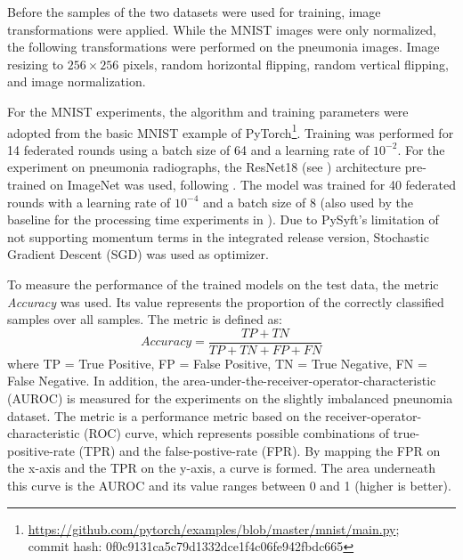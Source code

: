 Before the samples of the two datasets were used for training, image transformations were applied. While the MNIST images were only normalized, the following transformations were performed on the pneumonia images.
Image resizing to $256 \times 256$ pixels,
random horizontal flipping,
random vertical flipping,
and image normalization.

For the MNIST experiments, the algorithm and training parameters were adopted from the basic MNIST example of PyTorch\footnote{\url{https://github.com/pytorch/examples/blob/master/mnist/main.py};\\commit hash: 0f0c9131ca5c79d1332dce1f4c06fe942fbdc665}. Training was performed for 14 federated rounds using a batch size of 64 and a learning rate of $10^{-2}$. For the experiment on pneumonia radiographs, the ResNet18 (see \cite{He2016DeepRecognition}) architecture pre-trained on ImageNet was used, following \cite{Kaissis2021End-to-endImaging}. The model was trained for 40 federated rounds with a learning rate of $10^{-4}$ and a batch size of 8 (also used by the baseline for the processing time experiments in \cite{Kaissis2021End-to-endImaging}). Due to PySyft's limitation of not supporting momentum terms in the integrated release version, Stochastic Gradient Descent (SGD) was used as optimizer.

To measure the performance of the trained models on the test data, the metric \textit{Accuracy} was used. Its value represents the proportion of the correctly classified samples over all samples. The metric is defined as:
\begin{equation}
Accuracy=\frac{TP + TN}{TP + TN + FP + FN} \label{eq:accuracy}
\end{equation}
where TP = True Positive, FP = False Positive, TN = True Negative, FN = False Negative.
In addition, the area-under-the-receiver-operator-characteristic (AUROC) is measured for the experiments on the slightly imbalanced pneunomia dataset.
The metric is a performance metric based on the receiver-operator-characteristic (ROC) curve, which represents possible combinations of true-positive-rate (TPR) and the false-postive-rate (FPR).
By mapping the FPR on the x-axis and the TPR on the y-axis, a curve is formed. The area underneath this curve is the AUROC and its value ranges between 0 and 1 (higher is better). 

